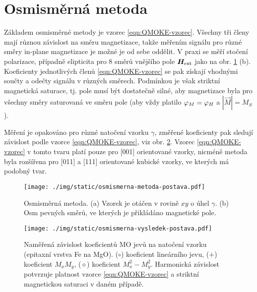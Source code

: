 \section{Osmisměrná metoda}
\label{chap:osmismerna-metoda}

Základem osmisměrné metody\cite{postavaAnisotropyQuadraticMagnetooptic2002} je vzorec \eqref{eqn:QMOKE-vzorec}.
Všechny tři členy mají různou závislost na směru magnetizace, takže měřením signálu pro různé směry in-plane magnetizace je možné je od sebe oddělit.
V praxi se měří stočení polarizace, případně elipticita pro 8 směrů vnějšího pole $\bm{H}_\textrm{ext}$ jako na obr. \ref{fig:osmismerna-metoda} (b).
Koeficienty jednotlivých členů \eqref{eqn:QMOKE-vzorec} se pak získají vhodnými součty a odečty signálu v různých směrech.
Podmínkou je však striktní magnetická saturace, tj. pole musí být dostatečně silné, aby magnetizace byla pro všechny směry saturovaná ve směru pole (aby vždy platilo $\varphi_M=\varphi_H$ a $|\vec{M}|=M_S$).

Měření je opakováno pro různé natočení vzorku $\gamma$, změřené koeficienty pak sledují závislost podle vzorce \eqref{eqn:QMOKE-vzorec}, viz obr. \ref{fig:osmismerna-vysledky}.
Vzorec \eqref{eqn:QMOKE-vzorec} v tomto tvaru platí pouze pro [001] orientované vzorky, nicméně metoda byla rozšířena pro [011] a [111] orientované kubické vzorky, ve kterých má podobný tvar\cite{silberQuadraticMagnetoopticKerr2019a,hamrlovaQuadraticinmagnetizationPermittivityConductivity2013}.

\begin{figure}[htbp]
    \centering
    \texttt{[image: ./img/static/osmismerna-metoda-postava.pdf]}
    \caption{Osmisměrná metoda. (a) Vzorek je otáčen v rovině $xy$ o úhel $\gamma$. (b) Osm pevných směrů, ve kterých je přikládáno magnetické pole. \cite{postavaAnisotropyQuadraticMagnetooptic2002}}
    \label{fig:osmismerna-metoda}
\end{figure}

\begin{figure}[htbp]
    \centering
    \texttt{[image: ./img/static/osmismerna-vysledek-postava.pdf]}
    \caption{Naměřená závislost koeficientů MO jevů na natočení vzorku (epitaxní vrstva Fe na MgO). ($\circ$) koeficient lineárního jevu, ($+$) koeficient $M_xM_y$, ($\diamond$) koeficient $M_x^2-M_y^2$. Harmonická závislost potvrzuje platnost vzorce \eqref{eqn:QMOKE-vzorec} a striktní magnetickou saturaci v daném případě. \cite{postavaAnisotropyQuadraticMagnetooptic2002}}
    \label{fig:osmismerna-vysledky}
\end{figure}
